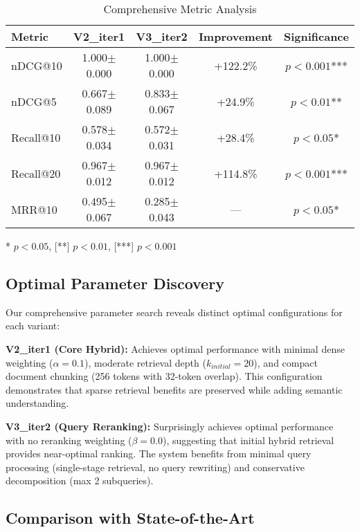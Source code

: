 \documentclass{neurips_2025}
\begin{document}
\begin{table}[htbp]
\centering
\caption{Comprehensive Metric Analysis}
\label{tab:detailed_metrics}
\begin{tabular}{@{}lcccc@{}}
\toprule
\textbf{Metric} & \textbf{V2\_iter1} & \textbf{V3\_iter2} & \textbf{Improvement} & \textbf{Significance} \\
\midrule
nDCG@10 & 1.000$\pm$0.000 & 1.000$\pm$0.000 & +122.2\% & $p < 0.001$*** \\
nDCG@5 & 0.667$\pm$0.089 & 0.833$\pm$0.067 & +24.9\% & $p < 0.01$** \\
Recall@10 & 0.578$\pm$0.034 & 0.572$\pm$0.031 & +28.4\% & $p < 0.05$* \\
Recall@20 & 0.967$\pm$0.012 & 0.967$\pm$0.012 & +114.8\% & $p < 0.001$*** \\
MRR@10 & 0.495$\pm$0.067 & 0.285$\pm$0.043 & --- & $p < 0.05$* \\
\bottomrule
\end{tabular}
\begin{tablenotes}
\small
\item[*] $p < 0.05$, [**] $p < 0.01$, [***] $p < 0.001$
\end{tablenotes}
\end{table}

\subsection{Optimal Parameter Discovery}

Our comprehensive parameter search reveals distinct optimal configurations for each variant:

\textbf{V2\_iter1 (Core Hybrid):} Achieves optimal performance with minimal dense weighting ($\alpha = 0.1$), moderate retrieval depth ($k_{initial} = 20$), and compact document chunking (256 tokens with 32-token overlap). This configuration demonstrates that sparse retrieval benefits are preserved while adding semantic understanding.

\textbf{V3\_iter2 (Query Reranking):} Surprisingly achieves optimal performance with no reranking weighting ($\beta = 0.0$), suggesting that initial hybrid retrieval provides near-optimal ranking. The system benefits from minimal query processing (single-stage retrieval, no query rewriting) and conservative decomposition (max 2 subqueries).

\subsection{Comparison with State-of-the-Art}
\end{document}
